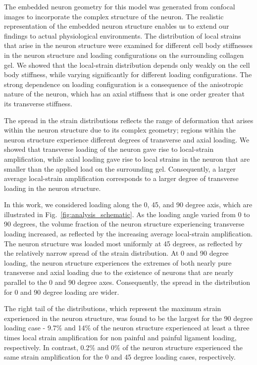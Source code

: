\documentclass[]{interact}
\begin{document}
The embedded neuron geometry for this model was generated from confocal images to incorporate the complex structure of the neuron. The realistic representation of the embedded neuron structure enables us to extend our findings to actual physiological environments. The distribution of local strains that arise in the neuron structure were examined for different cell body stiffnesses in the neuron structure and loading configurations on the surrounding collagen gel. We showed that the local-strain distribution depends only weakly on the cell body stiffness, while varying significantly for different loading configurations. The strong dependence on loading configuration is a consequence of the anisotropic nature of the neuron, which has an axial stiffness that is one order greater that its transverse stiffness.

The spread in the strain distributions reflects the range of deformation that arises within the neuron structure due to its complex geometry; regions within the neuron structure experience different degrees of transverse and axial loading. We showed that transverse loading of the neuron gave rise to local-strain amplification, while axial loading gave rise to local strains in the neuron that are smaller than the applied load on the surrounding gel. Consequently, a larger average local-strain amplification corresponds to a larger degree of transverse loading in the neuron structure.

In this work, we considered loading along the 0, 45, and 90 degree axis, which are illustrated in Fig.\ \ref{fig:analysis_schematic}. As the loading angle varied from 0 to 90 degrees, the volume fraction of the neuron structure experiencing transverse loading increased, as reflected by the increasing average local-strain amplification. The neuron structure was loaded most uniformly at 45 degrees, as reflected by the relatively narrow spread of the strain distribution. At 0 and 90 degree loading, the neuron structure experiences the extremes of both nearly pure transverse and axial loading due to the existence of neurons that are nearly parallel to the 0 and 90 degree axes. Consequently, the spread in the distribution for 0 and 90 degree loading are wider.

The right tail of the distributions, which represent the maximum strain experienced in the neuron structure, was found to be the largest for the 90 degree loading case - 9.7$\%$ and 14$\%$ of the neuron structure experienced at least a three times local strain amplification for non painful and painful ligament loading, respectively. In contrast, 0.2$\%$ and 0$\%$ of the neuron structure experienced the same strain amplification for the 0 and 45 degree loading cases, respectively.
\end{document}
